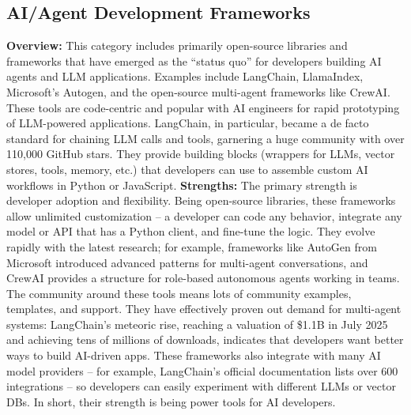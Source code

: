 \documentclass[11pt, a4paper, oneside]{article}
\begin{document}
\subsection{AI/Agent Development Frameworks}
\textbf{Overview:} This category includes primarily open-source libraries and frameworks that have emerged as the “status quo” for developers building AI agents and LLM applications. Examples include LangChain, LlamaIndex, Microsoft's Autogen, and the open-source multi-agent frameworks like CrewAI. These tools are code-centric and popular with AI engineers for rapid prototyping of LLM-powered applications. LangChain, in particular, became a de facto standard for chaining LLM calls and tools, garnering a huge community with over 110,000 GitHub stars\cite{langchainGitHub}. They provide building blocks (wrappers for LLMs, vector stores, tools, memory, etc.) that developers can use to assemble custom AI workflows in Python or JavaScript.
\newline\newline
\textbf{Strengths:} The primary strength is developer adoption and flexibility. Being open-source libraries, these frameworks allow unlimited customization – a developer can code any behavior, integrate any model or API that has a Python client, and fine-tune the logic. They evolve rapidly with the latest research; for example, frameworks like AutoGen from Microsoft introduced advanced patterns for multi-agent conversations\cite{autogenGitHub}, and CrewAI provides a structure for role-based autonomous agents working in teams\cite{crewaiGitHub}. The community around these tools means lots of community examples, templates, and support. They have effectively proven out demand for multi-agent systems: LangChain's meteoric rise, reaching a valuation of \$1.1B in July 2025\cite{langchainValuation} and achieving tens of millions of downloads, indicates that developers want better ways to build AI-driven apps. These frameworks also integrate with many AI model providers – for example, LangChain's official documentation lists over 600 integrations\cite{langchainIntegrations} – so developers can easily experiment with different LLMs or vector DBs. In short, their strength is being power tools for AI developers.
\newline\newline
\end{document}
